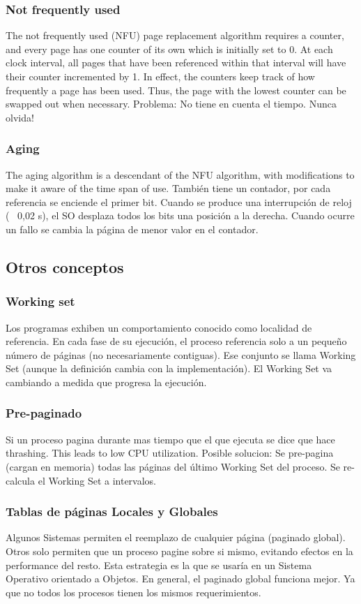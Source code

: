 \documentclass[a4paper, twoside]{article}
\begin{document}
\subsubsection{Not frequently used}
The not frequently used (NFU) page replacement algorithm requires a counter, and every page has one counter of its own which is initially set to 0. At each clock interval, all pages that have been referenced within that interval will have their counter incremented by 1. In effect, the counters keep track of how frequently a page has been used. Thus, the page with the lowest counter can be swapped out when necessary.
Problema: No tiene en cuenta el tiempo. Nunca olvida!

\subsubsection{Aging}
The aging algorithm is a descendant of the NFU algorithm, with modifications to make it aware of the time span of use. También tiene un contador, por cada referencia se enciende el primer bit. Cuando se produce una interrupción de reloj (~ 0,02 s), el SO desplaza todos los bits una posición a la derecha. Cuando ocurre un fallo se cambia la página de menor valor en el contador.

\subsection{Otros conceptos}
\subsubsection{Working set}
Los programas exhiben un comportamiento conocido como localidad de referencia. En cada fase de su ejecución, el proceso referencia solo a un pequeño número de páginas (no necesariamente contiguas). Ese conjunto se llama Working Set (aunque la definición cambia con la implementación). El Working Set va cambiando a medida que progresa la ejecución.

\subsubsection{Pre-paginado}
Si un proceso pagina durante mas tiempo que el que ejecuta se dice que hace thrashing. This leads to low CPU utilization.
Posible solucion: Se pre-pagina (cargan en memoria) todas las páginas del último Working Set del proceso. Se re-calcula el Working Set a intervalos.

\subsubsection{Tablas de páginas Locales y Globales}
Algunos Sistemas permiten el reemplazo de cualquier página (paginado global).
Otros solo permiten que un proceso pagine sobre si mismo, evitando efectos en la performance del resto. Esta estrategia es la que se usaría en un Sistema Operativo orientado a Objetos.
En general, el paginado global funciona mejor. Ya que no todos los procesos tienen los mismos requerimientos.
\end{document}
